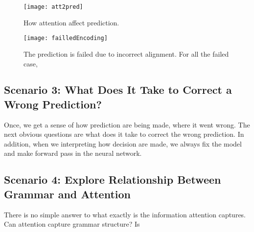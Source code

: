 \begin{figure}[htbp]
\centering
\vspace{-2mm}
 \texttt{[image: att2pred]}
 \caption{
How attention affect prediction.
%
}
\label{fig:att2pred}
\end{figure}




\begin{figure*}[t]
\centering
\vspace{-2mm}
 \texttt{[image: failledEncoding]}
 \caption{
The prediction is failed due to incorrect alignment. For all the failed case, 
 }
\label{fig:failedEncoding}
\end{figure*}



\subsection{Scenario 3: What Does It Take to Correct a Wrong Prediction?}
Once, we get a sense of how prediction are being made, where it went wrong. The next obvious questions are what does it take to correct the wrong prediction. 
In addition, when we interpreting how decision are made, we always fix the model and make forward pass in the neural network.

\subsection{Scenario 4: Explore Relationship Between Grammar and Attention}
There is no simple answer to what exactly is the information attention captures.
Can attention capture grammar structure? Is 

